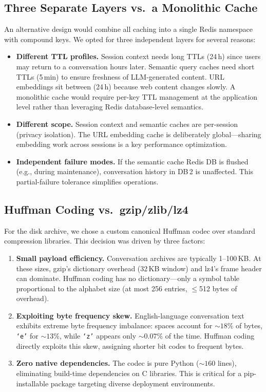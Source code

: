 \documentclass[conference]{IEEEtran}
\begin{document}
\subsection{Three Separate Layers vs.\ a Monolithic Cache}

An alternative design would combine all caching into a single Redis namespace with compound keys. We opted for three independent layers for several reasons:

\begin{itemize}
\item \textbf{Different TTL profiles.} Session context needs long TTLs (24\,h) since users may return to a conversation hours later. Semantic query caches need short TTLs (5\,min) to ensure freshness of LLM-generated content. URL embeddings sit between (24\,h) because web content changes slowly. A monolithic cache would require per-key TTL management at the application level rather than leveraging Redis database-level semantics.

\item \textbf{Different scope.} Session context and semantic caches are per-session (privacy isolation). The URL embedding cache is deliberately global---sharing embedding work across sessions is a key performance optimization.

\item \textbf{Independent failure modes.} If the semantic cache Redis DB is flushed (e.g., during maintenance), conversation history in DB\,2 is unaffected. This partial-failure tolerance simplifies operations.
\end{itemize}

\subsection{Huffman Coding vs.\ gzip/zlib/lz4}

For the disk archive, we chose a custom canonical Huffman codec over standard compression libraries. This decision was driven by three factors:

\begin{enumerate}
\item \textbf{Small payload efficiency.} Conversation archives are typically 1--100\,KB. At these sizes, gzip's dictionary overhead (32\,KB window) and lz4's frame header can dominate. Huffman coding has no dictionary---only a symbol table proportional to the alphabet size (at most 256 entries, $\leq$512 bytes of overhead).

\item \textbf{Exploiting byte frequency skew.} English-language conversation text exhibits extreme byte frequency imbalance: spaces account for ${\sim}18\%$ of bytes, \texttt{`e'} for ${\sim}13\%$, while \texttt{`z'} appears only ${\sim}0.07\%$ of the time. Huffman coding directly exploits this skew, assigning shorter bit codes to frequent bytes.

\item \textbf{Zero native dependencies.} The codec is pure Python (${\sim}160$ lines), eliminating build-time dependencies on C libraries. This is critical for a pip-installable package targeting diverse deployment environments.
\end{enumerate}
\end{document}

